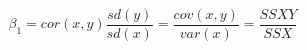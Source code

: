\documentclass[10pt]{article}
\begin{document}
\[\beta_1 = cor(x,y) \frac{sd(y)}{sd(x)} = \frac{cov(x,y)}{var(x)} = \frac{SSXY}{SSX}
\]
\end{document}
